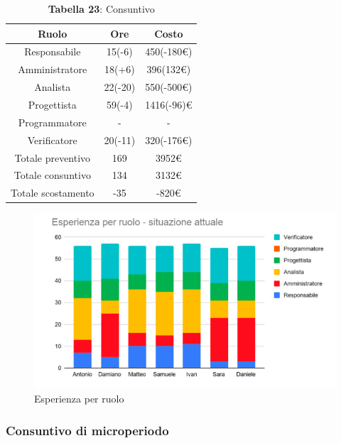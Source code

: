 \begin{table}[H]
	\centering
	\renewcommand{\arraystretch}{1.5}
	\begin{tabular}{|c|c|c|}
		\hline
		\rowcolor{lighter-grayer}
		Ruolo & Ore & Costo \\ \hline
		Responsabile & 15(-6) & 450(-180\euro) \\ \hline
		Amministratore & 18(+6) & 396(132\euro) \\ \hline
		Analista & 22(-20) & 550(-500\euro) \\ \hline
		Progettista & 59(-4) & 1416(-96)\euro \\ \hline
		Programmatore & - & - \\ \hline
		Verificatore & 20(-11) & 320(-176\euro) \\ \hline
		Totale preventivo & 169 & 3952\euro \\ \hline
		Totale consuntivo & 134 & 3132\euro \\ \hline
		Totale scostamento & -35 & -820\euro \\ \hline
	\end{tabular}
	\caption*{\textbf{Tabella 23}: Consuntivo\\}
\end{table}
\begin{figure}[H]
	\centering
	\includegraphics[width=15cm]{res/images/GraficoRuoli.png}
	\caption{Esperienza per ruolo}
	\label{fig:Esperienza per ruolo}
\end{figure}

\subsubsection{Consuntivo di microperiodo}
